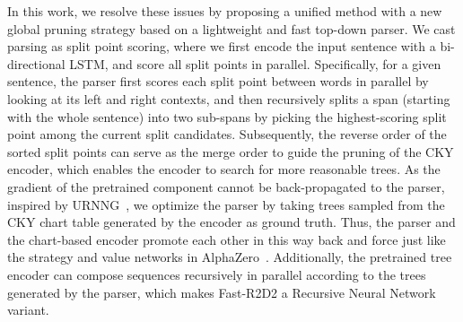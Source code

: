In this work, we resolve these issues by proposing a unified method with a new global pruning strategy based on a lightweight and fast top-down parser. 
We cast parsing as split point scoring, where we first encode the input sentence with a bi-directional LSTM, and score all split points in parallel.
Specifically, for a given sentence, the parser first scores each split point between words in parallel by looking at its left and right contexts, and then recursively splits a span (starting with the whole sentence) into two sub-spans by picking the highest-scoring split point among the current split candidates.
Subsequently, the reverse order of the sorted split points can serve as the merge order to guide the pruning of the CKY encoder, which enables the encoder to search for more reasonable trees.
As the gradient of the pretrained component cannot be back-propagated to the parser, inspired by URNNG~\cite{dblp:conf/naacl/kimrykdm19}, we optimize the parser by taking trees sampled from the CKY chart table generated by the encoder as ground truth. Thus, the parser and the chart-based encoder promote each other in this way back and force just like the strategy and value networks in AlphaZero~\cite{DBLP:journals/nature/SilverSSAHGHBLB17}.
Additionally, the pretrained tree encoder can compose sequences recursively in parallel according to the trees generated by the parser, which makes Fast-R2D2 a Recursive Neural Network~\cite{DBLP:journals/ai/Pollack90,DBLP:conf/emnlp/SocherPWCMNP13} variant.




